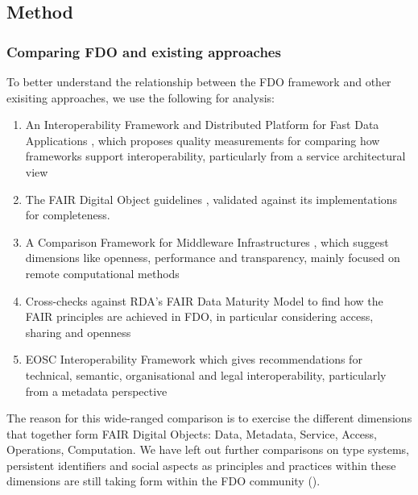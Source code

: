 \subsection{Method}

\hypertarget{ch3:comparing}{%
\subsubsection{Comparing FDO and existing approaches}\label{ch3:comparing}}

To better understand the relationship between the FDO framework and other exisiting approaches, we use the following for analysis:

\begin{enumerate}
\def\labelenumi{\arabic{enumi}.}
\tightlist
\item
  An Interoperability Framework and Distributed Platform for Fast Data Applications \cite{delgadoInteroperabilityFrameworkDistributed2016a}, which proposes quality measurements for comparing how frameworks support interoperability, particularly from a service architectural view
\item
  The FAIR Digital Object guidelines \cite{boninoFAIRDigitalObject}, validated against its implementations for completeness.
\item
  A Comparison Framework for Middleware Infrastructures \cite{zarrasComparisonFrameworkMiddleware2004a}, which suggest dimensions like openness, performance and transparency, mainly focused on remote computational methods
\item
  Cross-checks against RDA's FAIR Data Maturity Model \cite{bahimFAIRDataMaturity2020a} to find how the FAIR principles are achieved in FDO, in particular considering access, sharing and openness
\item
  EOSC Interoperability Framework \cite{corchoEOSCInteroperabilityFramework2021b} which gives recommendations for technical, semantic, organisational and legal interoperability, particularly from a metadata perspective
\end{enumerate}

The reason for this wide-ranged comparison is to exercise the different dimensions that together form FAIR Digital Objects: Data, Metadata, Service, Access, Operations, Computation.
We have left out further comparisons on type systems, persistent identifiers and social aspects as principles and practices within these dimensions are still taking form within the FDO community ().

